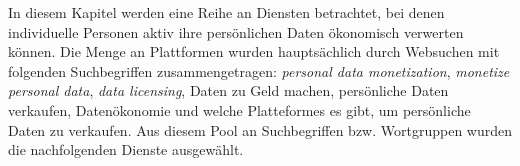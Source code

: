 In diesem Kapitel werden eine Reihe an Diensten betrachtet, bei denen individuelle Personen aktiv ihre persönlichen Daten ökonomisch verwerten können. Die Menge an Plattformen wurden hauptsächlich durch Websuchen mit folgenden Suchbegriffen zusammengetragen: \textit{personal data monetization}, \textit{monetize personal data}, \textit{data licensing}, Daten zu Geld machen, persönliche Daten verkaufen, Datenökonomie und welche Platteformes es gibt, um persönliche Daten zu verkaufen. Aus diesem Pool an Suchbegriffen bzw. Wortgruppen wurden die nachfolgenden Dienste ausgewählt.